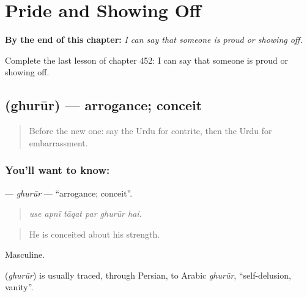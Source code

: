 
\chapter{Pride and Showing Off}
\label{ch:ur-pride-and-showing-off}

\begin{chapteropening}
\textbf{By the end of this chapter:} \emph{I can say that someone is proud or showing off.}

Complete the last lesson of chapter 452: I can say that someone is proud or showing off.
\end{chapteropening}

\section[\texorpdfstring{\ur{غرور} (ghurūr)}{غرور (ghurūr)}]{ (ghurūr) — arrogance; conceit}

\label{lesson:UR-C452-ghurur}



\begin{quote}
Before the new one: say the Urdu for contrite, then the Urdu for embarrassment.
\end{quote}

\subsection*{You'll want to know: }
\textbf{} — \emph{ghurūr} — \textquotedblleft{}arrogance; conceit\textquotedblright{}.

\begin{quote}
     
\end{quote}

\begin{quote}
\emph{use apnī tāqat par ghurūr hai.}
\end{quote}

\begin{quote}
He is conceited about his strength.
\end{quote}

Masculine.

\begin{cousinweb}
\textbf{} (\emph{ghurūr}) is usually traced, through Persian, to Arabic \emph{ghurūr}, \textquotedblleft{}self-delusion, vanity\textquotedblright{}.
\end{cousinweb}

